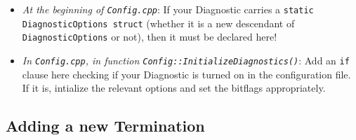 \documentclass[11pt,a4paper]{article}
\newcommand{\code}[1]{{\tt #1}}
\begin{document}
\begin{itemize}
 \item[D.1.] \emph{At the beginning of \code{Config.cpp}}: If your Diagnostic carries a \code{static DiagnosticOptions struct} (whether it is a new descendant of \code{DiagnosticOptions} or not), then it must be declared here!
 \item[D.2.] \emph{In \code{Config.cpp}, in function \code{Config::InitializeDiagnostics()}}: Add an \code{if} clause here checking if your Diagnostic is turned on in the configuration file. If it is, intialize the relevant options and set the bitflags appropriately.
\end{itemize}


\subsection{Adding a new Termination}
\end{document}
